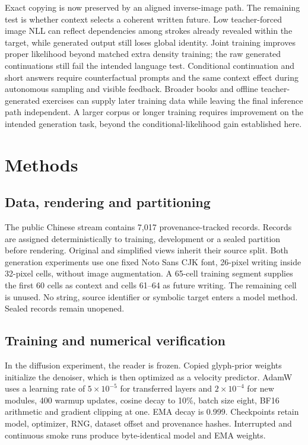 Exact copying is now preserved by an aligned inverse-image path. The remaining
test is whether context selects a coherent written future. Low teacher-forced
image NLL can reflect dependencies among strokes already revealed within the
target, while generated output still loses global identity. Joint training
improves proper likelihood beyond matched extra density training; the raw
generated continuations still fail the intended language test. Conditional
continuation and short answers require counterfactual prompts and the same
context effect during autonomous sampling and visible feedback.
Broader books and offline teacher-generated exercises can supply later
training data while leaving the final inference path independent. A larger
corpus or longer training requires improvement on the intended generation
task, beyond the conditional-likelihood gain established here.

\section*{Methods}
\subsection*{Data, rendering and partitioning}
The public Chinese stream contains 7,017 provenance-tracked records. Records
are assigned deterministically to training, development or a sealed partition
before rendering. Original and simplified views inherit their source split.
Both generation experiments use one fixed Noto Sans CJK font, 26-pixel writing
inside 32-pixel cells, without image augmentation. A 65-cell training segment
supplies the first 60 cells as context and cells 61--64 as future writing.
The remaining cell is unused. No string, source identifier or symbolic target
enters a model method. Sealed records remain unopened.

\subsection*{Training and numerical verification}
In the diffusion experiment, the reader is frozen. Copied glyph-prior weights initialize the denoiser,
which is then optimized as a velocity predictor. AdamW uses a learning rate of
$5\times10^{-5}$ for transferred layers and $2\times10^{-4}$ for new modules,
400 warmup updates, cosine decay to 10\%, batch size eight, BF16 arithmetic and
gradient clipping at one. EMA decay is 0.999. Checkpoints retain model,
optimizer, RNG, dataset offset and provenance hashes. Interrupted and
continuous smoke runs produce byte-identical model and EMA weights.


